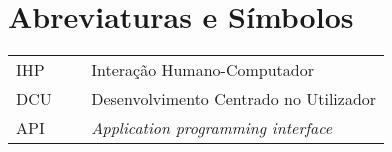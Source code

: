 \chapter*{Abreviaturas e Símbolos}

\begin{flushleft}
\begin{tabular}{l p{0.8\linewidth}}
IHP     & Interação Humano-Computador\\
DCU     & Desenvolvimento Centrado no Utilizador\\
API		& \textit{Application programming interface}
\end{tabular}
\end{flushleft}

